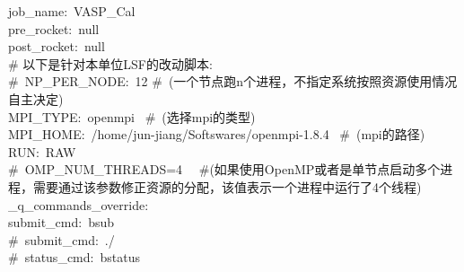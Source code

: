 \documentclass[10pt,a4paper]{article}
\begin{document}
\begin{itemize}
{{		\textrm{job\_name:~VASP\_Cal}\\
		\textrm{pre\_rocket:~null}\\
		\textrm{post\_rocket:~null}\\
		\# 以下是针对本单位\textrm{LSF}的改动脚本:\\
		\textrm{\#~NP\_PER\_NODE:~12 \#~(一个节点跑\textrm{n}个进程，不指定系统按照资源使用情况自主决定)}\\
		\textrm{MPI\_TYPE:~openmpi ~\#~(选择mpi的类型)}\\
		\textrm{MPI\_HOME:~/home/jun-jiang/Softswares/openmpi-1.8.4 ~\#~(\textrm{mpi}的路径)}\\
		\textrm{RUN:~RAW}\\
		\textrm{\#~OMP\_NUM\_THREADS=4 ~~\#(如果使用\textrm{OpenMP}或者是单节点启动多个进程，需要通过该参数修正资源的分配，该值表示一个进程中运行了4个线程)}\\
		\textrm{\_q\_commands\_override:}\\
		\hspace*{25pt}\textrm{submit\_cmd:~bsub}\\
		\hspace*{25pt}\#~\textrm{submit\_cmd:~./}\\
		\hspace*{25pt}\#~\textrm{status\_cmd:~bstatus}}}
\end{itemize}
\end{document}
